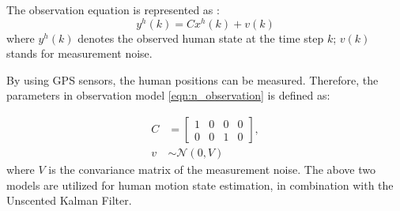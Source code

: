 \documentclass[letterpaper, 10 pt, conference]{ieeeconf}
\begin{document}
	
	
	
	\addtocounter{equation}{-2}
	
	The observation equation is represented as : 
	\begin{equation}
	y^h(k)=Cx^h(k)+v(k)\label{eqn:n_observation}
	\end{equation}
	where $y^h(k)$ denotes the observed human state at the time step $k$; $v(k)$ stands for measurement noise. 
	
	By using GPS sensors, the human positions can be measured.
	Therefore, the parameters in observation model \cref{eqn:n_observation} is defined as:
	\addtocounter{equation}{-1}
	\begin{subequations}
		\begin{align*}
		C&=\left[
		\begin{array}{cccc}
		1& 0& 0& 0\\
		0& 0& 1& 0
		\end{array}\right],\\
		v&\sim\mathcal{N}(0,V)
		\end{align*}
	\end{subequations}
	where $V$ is the convariance matrix of the measurement noise.
	The above two models are utilized for human motion state estimation, in combination with the Unscented Kalman Filter.
	
	
\end{document}
